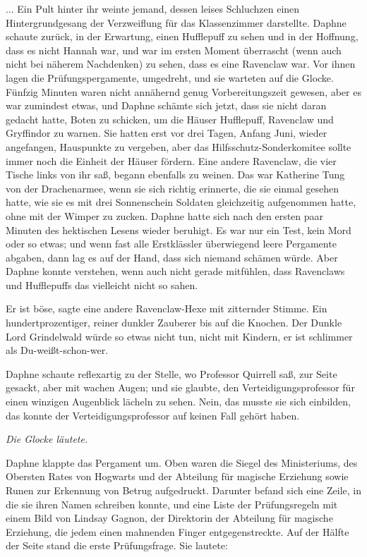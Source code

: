 ... Ein Pult hinter ihr weinte jemand, dessen leises Schluchzen einen
Hintergrundgesang der Verzweiflung für das Klassenzimmer darstellte. Daphne
schaute zurück, in der Erwartung, einen Hufflepuff zu sehen und in der Hoffnung,
dass es nicht Hannah war, und war im ersten Moment überrascht (wenn auch nicht
bei näherem Nachdenken) zu sehen, dass es eine Ravenclaw war. Vor ihnen lagen
die Prüfungspergamente, umgedreht, und sie warteten auf die Glocke. Fünfzig
Minuten waren nicht annähernd genug Vorbereitungszeit gewesen, aber es war
zumindest etwas, und Daphne schämte sich jetzt, dass sie nicht daran gedacht
hatte, Boten zu schicken, um die Häuser Hufflepuff, Ravenclaw und Gryffindor zu
warnen. Sie hatten erst vor drei Tagen, Anfang Juni, wieder angefangen,
Hauspunkte zu vergeben, aber das Hilfsschutz-Sonderkomitee sollte immer noch die
Einheit der Häuser fördern. Eine andere Ravenclaw, die vier Tische links von ihr
saß, begann ebenfalls zu weinen. Das war Katherine Tung von der Drachenarmee,
wenn sie sich richtig erinnerte, die sie einmal gesehen hatte, wie sie es mit
drei Sonnenschein Soldaten gleichzeitig aufgenommen hatte, ohne mit der Wimper
zu zucken. Daphne hatte sich nach den ersten paar Minuten des hektischen Lesens
wieder beruhigt. Es war nur ein Test, kein Mord oder so etwas; und wenn fast
alle Erstklässler überwiegend leere Pergamente abgaben, dann lag es auf der
Hand, dass sich niemand schämen würde. Aber Daphne konnte verstehen, wenn auch
nicht gerade mitfühlen, dass Ravenclaws und Hufflepuffs das vielleicht nicht so
sahen.

\glqq{}Er ist böse\grqq{}, sagte eine andere Ravenclaw-Hexe mit zitternder
Stimme. \glqq{}Ein hundertprozentiger, reiner dunkler Zauberer bis auf die
Knochen. Der Dunkle Lord Grindelwald würde so etwas nicht tun, nicht mit
Kindern, er ist schlimmer als Du-weißt-schon-wer.\grqq{}

Daphne schaute reflexartig zu der Stelle, wo Professor Quirrell saß, zur Seite
gesackt, aber mit wachen Augen; und sie glaubte, den Verteidigungsprofessor für
einen winzigen Augenblick lächeln zu sehen. Nein, das musste sie sich einbilden,
das konnte der Verteidigungsprofessor auf keinen Fall gehört haben.

\emph{Die Glocke läutete.}

Daphne klappte das Pergament um. Oben waren die Siegel des Ministeriums, des
Obersten Rates von Hogwarts und der Abteilung für magische Erziehung sowie Runen
zur Erkennung von Betrug aufgedruckt. Darunter befand sich eine Zeile, in die
sie ihren Namen schreiben konnte, und eine Liste der Prüfungsregeln mit einem
Bild von Lindsay Gagnon, der Direktorin der Abteilung für magische Erziehung,
die jedem einen mahnenden Finger entgegenstreckte. Auf der Hälfte der Seite
stand die erste Prüfungsfrage. Sie lautete:


